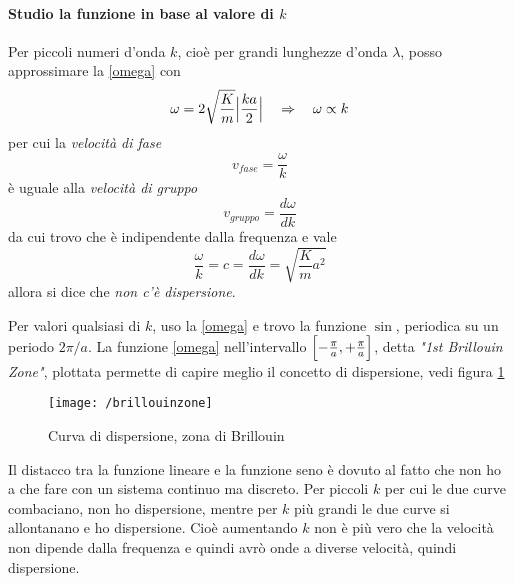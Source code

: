 \paragraph{Studio la funzione in base al valore di $k$} 
Per piccoli numeri d'onda $k$, cioè per grandi lunghezze d'onda $\lambda$, posso approssimare la \ref{omega} con
\begin{equation}
\omega = 2 \sqrt{\frac{K}{m}} \Bigl| \frac{ka}{2}  \Bigr|  \quad\Rightarrow\quad \omega \propto k
\end{equation}
per cui la \textit{velocità di fase}
\begin{equation}
v_{fase} = \frac{\omega}{k}
\end{equation}
è uguale alla \textit{velocità di gruppo}
\begin{equation}
v_{gruppo} = \frac{d \omega}{d k}
\end{equation}
da cui trovo che è indipendente dalla frequenza e vale
\begin{equation}
\frac{\omega}{k} = c = \frac{d \omega}{d k} = \sqrt{\frac{K}{m} a^2}
\end{equation}
allora si dice che \textit{non c'è dispersione}.

Per valori qualsiasi di $k$, uso la \ref{omega} e trovo la funzione $\sin$, periodica su un periodo $2\pi / a$.
La funzione \ref{omega} nell'intervallo $\Bigl[  -\frac{\pi}{a}, +\frac{\pi}{a}  \Bigr]$, detta \textit{"1st Brillouin Zone"}, plottata permette di capire meglio il concetto di dispersione, vedi figura \ref{dispersione} \\
\begin{figure}[h]
\centering
\texttt{[image: /brillouinzone]}
\caption{Curva di dispersione, zona di Brillouin}
\label{dispersione}
\end{figure}
Il distacco tra la funzione lineare e la funzione seno è dovuto al fatto che non ho a che fare con un sistema continuo ma discreto.
Per piccoli $k$ per cui le due curve combaciano, non ho dispersione, mentre per $k$ più grandi le due curve si allontanano e ho dispersione.
Cioè aumentando $k$ non è più vero che la velocità non dipende dalla frequenza e quindi avrò onde a diverse velocità, quindi dispersione.

